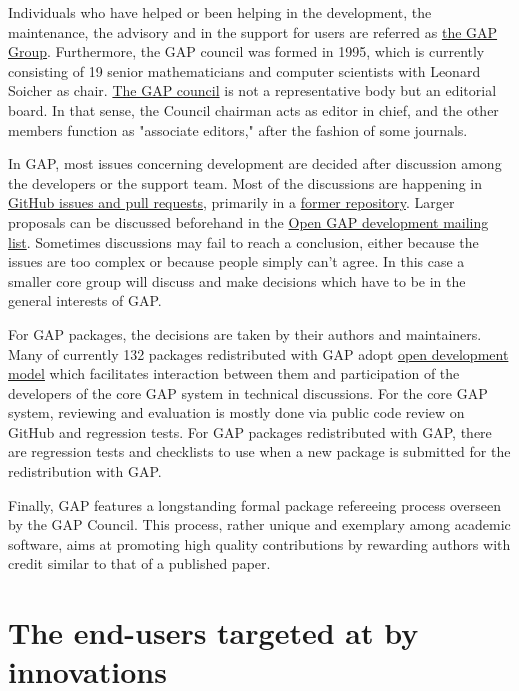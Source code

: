 \documentclass{deliverablereport}
\begin{document}
Individuals who have helped or been helping in the development, the maintenance, the advisory and in the support for users are referred as \href{https://www.gap-system.org/Contacts/People/people.html}{the GAP Group}.
Furthermore, the GAP council was formed in 1995, which is currently consisting of 19 senior mathematicians and computer scientists with Leonard Soicher as chair. \href{https://www.gap-system.org/Contacts/People/Council/council.html}{The GAP council} is not a representative body but an editorial board. In that sense, the Council chairman acts as editor in chief, and the other members function as "associate editors," after the fashion of some journals.

In GAP, most issues concerning development are decided after discussion among the developers or the support team. Most of the discussions are happening in \href{https://github.com/gap-system}{GitHub issues and pull requests}, primarily in a \href{https://github.com/gap-system/gap}{former repository}. Larger proposals can be discussed beforehand in the \href{http://mail.gap-system.org/mailman/listinfo/gap}{Open GAP development mailing list}. Sometimes discussions may fail to reach a conclusion, either because the issues are too complex or because people simply can’t agree. In this case a smaller core group will discuss and make decisions which have to be in the general interests of GAP. 

For GAP packages, the decisions are taken by their authors and maintainers. Many of currently 132 packages redistributed with GAP adopt \href{http://gap-packages.github.io/}{open development model} which facilitates interaction between them and participation of the developers of the core GAP system in technical discussions.
For the core GAP system, reviewing and evaluation is mostly done via public code review on GitHub and regression tests. For GAP packages redistributed with GAP, there are regression tests and checklists to use when a new package is submitted for the redistribution with GAP.

Finally, GAP features a longstanding formal package refereeing process
overseen by the GAP Council. This process, rather unique and exemplary
among academic software, aims at promoting high quality contributions
by rewarding authors with credit similar to that of a published paper.

\section{The end-users targeted at by innovations}
\end{document}
